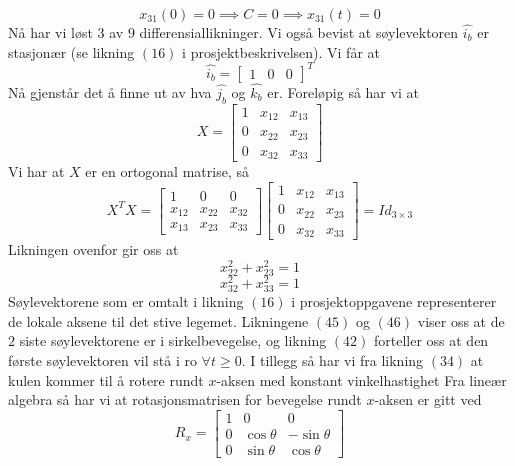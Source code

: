 \begin{equation}
    x_{31}(0)=0\implies C=0\implies x_{31}(t)=0
\end{equation}
Nå har vi løst $3$ av $9$ differensiallikninger. Vi også bevist at søylevektoren $\hat{i_b}$ er stasjonær (se likning $(16)$ i prosjektbeskrivelsen). Vi får at
\begin{equation}
\hat{i_b}=\begin{bmatrix}1&0&0\end{bmatrix}^T
\end{equation}
Nå gjenstår det å finne ut av hva $\hat{j_b}$ og $\hat{k_b}$ er. Foreløpig så har vi at
\begin{equation}
    X=\begin{bmatrix}1&x_{12}&x_{13}\\0&x_{22}&x_{23}\\0&x_{32}&x_{33}\end{bmatrix}
\end{equation}
Vi har at $X$ er en ortogonal matrise, så
\begin{equation}
    X^TX=\begin{bmatrix}1&0&0\\x_{12}&x_{22}&x_{32}\\x_{13}&x_{23}&x_{33}\end{bmatrix}\begin{bmatrix}1&x_{12}&x_{13}\\0&x_{22}&x_{23}\\0&x_{32}&x_{33}\end{bmatrix}=Id_{3\times3}
\end{equation}
Likningen ovenfor gir oss at
\begin{equation}
    x_{22}^2+x_{23}^2=1
\end{equation}
\begin{equation}
    x_{32}^2+x_{33}^2=1
\end{equation}
Søylevektorene som er omtalt i likning $(16)$ i prosjektoppgavene representerer de lokale aksene til det stive legemet. Likningene $(45)$ og $(46)$ viser oss at de $2$ siste søylevektorene er i sirkelbevegelse, og likning $(42)$ forteller oss at den første søylevektoren vil stå i ro $\forall t\geq0.$ I tillegg så har vi fra likning $(34)$ at kulen kommer til å rotere rundt $x$-aksen med konstant vinkelhastighet\newline\newline
Fra lineær algebra så har vi at rotasjonsmatrisen for bevegelse rundt $x$-aksen er gitt ved
\begin{equation}
    R_x=\begin{bmatrix}1&0&0\\0&\cos\theta&-\sin\theta\\0&\sin\theta&\cos\theta\end{bmatrix}
\end{equation}
